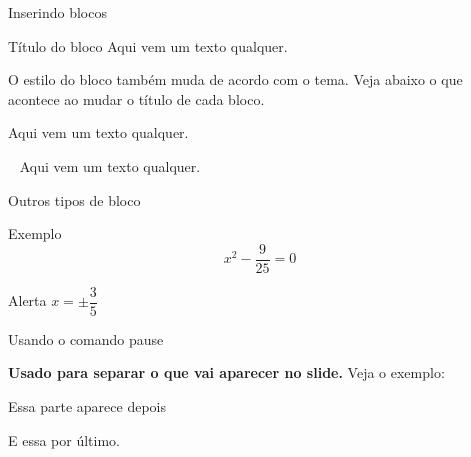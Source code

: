 \documentclass[aspectratio=169]{beamer}
\begin{document}
\begin{frame}{Inserindo blocos}  %
    \begin{block}{Título do bloco}
        Aqui vem um texto qualquer.
    \end{block}

    O estilo do bloco também muda de acordo com o tema.
    Veja abaixo o que acontece ao mudar o título de cada bloco.
    
    \begin{block}
        Aqui vem um texto qualquer.
    \end{block}

    \begin{block}{\ }
         Aqui vem um texto qualquer.
    \end{block}
\end{frame}

\begin{frame}{Outros tipos de bloco}
    \begin{exampleblock}{Exemplo}
        $$x^2-\frac{9}{25}=0$$
    \end{exampleblock}


    \begin{alertblock}{Alerta}
        $x=\pm\dfrac{3}{5}$
    \end{alertblock}

\end{frame}

\begin{frame}{Usando o comando pause}

    \textbf{Usado para separar o que vai aparecer no slide.} Veja o exemplo: \pause

    \begin{center}
        Essa parte aparece depois
    \end{center} \pause

    E essa por último.
    
\end{frame}
\end{document}
